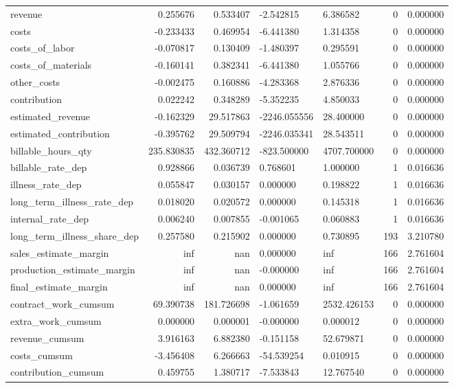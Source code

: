 \begin{landscape}
\begin{longtable}[h!]{lrrllrr}
revenue & 0.255676 & 0.533407 & -2.542815 & 6.386582 & 0 & 0.000000 \\
costs & -0.233433 & 0.469954 & -6.441380 & 1.314358 & 0 & 0.000000 \\
costs_of_labor & -0.070817 & 0.130409 & -1.480397 & 0.295591 & 0 & 0.000000 \\
costs_of_materials & -0.160141 & 0.382341 & -6.441380 & 1.055766 & 0 & 0.000000 \\
other_costs & -0.002475 & 0.160886 & -4.283368 & 2.876336 & 0 & 0.000000 \\
contribution & 0.022242 & 0.348289 & -5.352235 & 4.850033 & 0 & 0.000000 \\
estimated_revenue & -0.162329 & 29.517863 & -2246.055556 & 28.400000 & 0 & 0.000000 \\
estimated_contribution & -0.395762 & 29.509794 & -2246.035341 & 28.543511 & 0 & 0.000000 \\
billable_hours_qty & 235.830835 & 432.360712 & -823.500000 & 4707.700000 & 0 & 0.000000 \\
billable_rate_dep & 0.928866 & 0.036739 & 0.768601 & 1.000000 & 1 & 0.016636 \\
illness_rate_dep & 0.055847 & 0.030157 & 0.000000 & 0.198822 & 1 & 0.016636 \\
long_term_illness_rate_dep & 0.018020 & 0.020572 & 0.000000 & 0.145318 & 1 & 0.016636 \\
internal_rate_dep & 0.006240 & 0.007855 & -0.001065 & 0.060883 & 1 & 0.016636 \\
long_term_illness_share_dep & 0.257580 & 0.215902 & 0.000000 & 0.730895 & 193 & 3.210780 \\
sales_estimate_margin & inf & nan & 0.000000 & inf & 166 & 2.761604 \\
production_estimate_margin & inf & nan & -0.000000 & inf & 166 & 2.761604 \\
final_estimate_margin & inf & nan & 0.000000 & inf & 166 & 2.761604 \\
contract_work_cumsum & 69.390738 & 181.726698 & -1.061659 & 2532.426153 & 0 & 0.000000 \\
extra_work_cumsum & 0.000000 & 0.000001 & -0.000000 & 0.000012 & 0 & 0.000000 \\
revenue_cumsum & 3.916163 & 6.882380 & -0.151158 & 52.679871 & 0 & 0.000000 \\
costs_cumsum & -3.456408 & 6.266663 & -54.539254 & 0.010915 & 0 & 0.000000 \\
contribution_cumsum & 0.459755 & 1.380717 & -7.533843 & 12.767540 & 0 & 0.000000 \\

\end{longtable}
\end{landscape}
